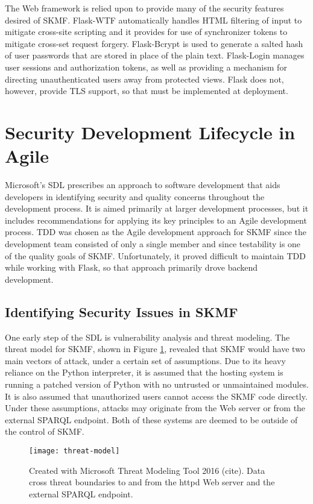 The Web framework is relied upon to provide many of the security features desired of SKMF. Flask-WTF automatically handles HTML filtering of input to mitigate cross-site scripting and it provides for use of synchronizer tokens to mitigate cross-set request forgery. Flask-Bcrypt is used to generate a salted hash of user passwords that are stored in place of the plain text. Flask-Login manages user sessions and authorization tokens, as well as providing a mechanism for directing unauthenticated users away from protected views. Flask does not, however, provide TLS support, so that must be implemented at deployment.


\section{Security Development Lifecycle in Agile}

Microsoft's SDL prescribes an approach to software development that aids developers in identifying security and quality concerns throughout the development process. It is aimed primarily at larger development processes, but it includes recommendations for applying its key principles to an Agile development process. TDD was chosen as the Agile development approach for SKMF since the development team consisted of only a single member and since testability is one of the quality goals of SKMF. Unfortunately, it proved difficult to maintain TDD while working with Flask, so that approach primarily drove backend development.


\subsection{Identifying Security Issues in SKMF}

One early step of the SDL is vulnerability analysis and threat modeling. The threat model for SKMF, shown in Figure \ref{threat-model}, revealed that SKMF would have two main vectors of attack, under a certain set of assumptions. Due to its heavy reliance on the Python interpreter, it is assumed that the hosting system is running a patched version of Python with no untrusted or unmaintained modules. It is also assumed that unauthorized users cannot access the SKMF code directly. Under these assumptions, attacks may originate from the Web server or from the external SPARQL endpoint. Both of these systems are deemed to be outside of the control of SKMF.

\begin{figure}[!t]
\texttt{[image: threat-model]}
\caption[Data flow diagram with threat boundaries]
 {\narrower Created with Microsoft Threat Modeling Tool 2016 (cite). Data cross threat boundaries to and from the httpd Web server and the external SPARQL endpoint.
 }
\label{threat-model}
\end{figure}


